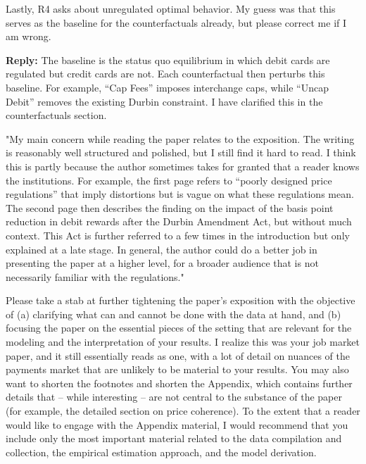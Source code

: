 \documentclass[main.tex]{subfiles}
\begin{document}
\begin{refsection}
\begin{refcommentnoclear}
Lastly, R4 asks about unregulated optimal behavior.
My guess was that this serves as the baseline for the counterfactuals already, but please correct me if I am wrong.
\end{refcommentnoclear}

\textbf{Reply:} The baseline is the status quo equilibrium in which debit cards are regulated but credit cards are not.
Each counterfactual then perturbs this baseline.
For example, ``Cap Fees'' imposes interchange caps, while ``Uncap Debit'' removes the existing Durbin constraint.
I have clarified this in the counterfactuals section.

\begin{refcommentnoclear}
"My main concern while reading the paper relates to the exposition.
The writing is reasonably well structured and polished, but I still find it hard to read.
I think this is partly because the author sometimes takes for granted that a reader knows the institutions.
For example, the first page refers to ``poorly designed price regulations'' that imply distortions but is vague on what these regulations mean.
The second page then describes the finding on the impact of the basis point reduction in debit rewards after the Durbin Amendment Act, but without much context.
This Act is further referred to a few times in the introduction but only explained at a late stage.
In general, the author could do a better job in presenting the paper at a higher level, for a broader audience that is not necessarily familiar with the regulations."

Please take a stab at further tightening the paper's exposition with the objective of (a) clarifying what can and cannot be done with the data at hand, and (b) focusing the paper on the essential pieces of the setting that are relevant for the modeling and the interpretation of your results.
I realize this was your job market paper, and it still essentially reads as one, with a lot of detail on nuances of the payments market that are unlikely to be material to your results.
You may also want to shorten the footnotes and shorten the Appendix, which contains further details that -- while interesting -- are not central to the substance of the paper (for example, the detailed section on price coherence).
To the extent that a reader would like to engage with the Appendix material, I would recommend that you include only the most important material related to the data compilation and collection, the empirical estimation approach, and the model derivation.


\end{refcommentnoclear}
\end{refsection}
\end{document}

